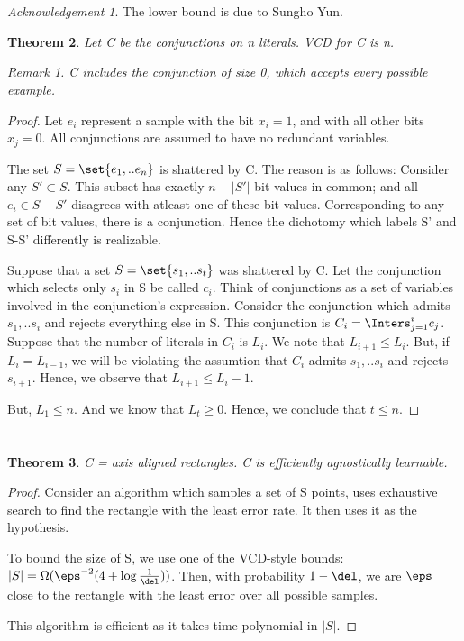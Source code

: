 \documentclass[10pt]{amsart}
\newtheorem{thm}{Theorem}[subsection]
\theoremstyle{remark}
\newtheorem*{ack}{Acknowledgement}
\newtheorem{rem}[thm]{Remark}
\begin{document}
\section{}
\begin{ack}
The lower bound is due to Sungho Yun.
\end{ack}

\begin{thm}
Let C be the conjunctions on n literals. VCD for C is n.
\begin{rem}
C includes the conjunction of size 0, which accepts every possible example.
\end{rem}
\end{thm}
\begin{proof}
Let $e_{i}$ represent a sample with the bit $x_{i}=1$, and with all other bits $x_{j} = 0$. All conjunctions are assumed to have no redundant variables.

The set $S = \set{e_{1}, .. e_{n}}$ is shattered by C. The reason is as follows: Consider any $S' \subset S$. This subset has exactly $n-|S'|$ bit values in common; and all $e_{i} \in S-S'$ disagrees with atleast one of these bit values. Corresponding to any set of bit values, there is a conjunction. Hence the dichotomy which labels S' and S-S' differently is realizable.

Suppose that a set $S = \set{s_{1}, .. s_{t}}$ was shattered by C. Let the conjunction which selects only $s_{i}$ in S be called $c_{i}$. Think of conjunctions as a set of variables involved in the conjunction's expression. Consider the conjunction which admits $s_{1}, .. s_{i}$ and rejects everything else in S. This conjunction is $C_{i} = \Inters_{j=1}^{i} c_{j}$. Suppose that the number of literals in $C_{i}$ is $L_{i}$. We note that $L_{i+1} \leq L_{i}$. But, if $L_{i} = L_{i-1}$, we will be violating the assumtion that $C_{i}$ admits $s_{1}, .. s_{i}$ and rejects $s_{i+1}$. Hence, we observe that $L_{i+1} \leq L_{i} - 1$.

But, $L_{1} \leq n$. And we know that $L_{t} \geq 0$. Hence, we conclude that $t\leq n$.
\end{proof}

\section{}
\begin{thm}
C = axis aligned rectangles. C is efficiently agnostically learnable.
\end{thm}
\begin{proof}
Consider an algorithm which samples a set of S points, uses
exhaustive search to find the rectangle with the least error rate.
It then uses it as the hypothesis.

To bound the size of S, we use one of the VCD-style bounds: $|S| = \Omega(\eps^{-2}(4 + \log \frac{1}{\del}))$. Then, with probability $1- \del$, we are $\eps$ close to the rectangle with the least error over all possible samples.

This algorithm is efficient as it takes time polynomial in $|S|$.
\end{proof}
\end{document}
